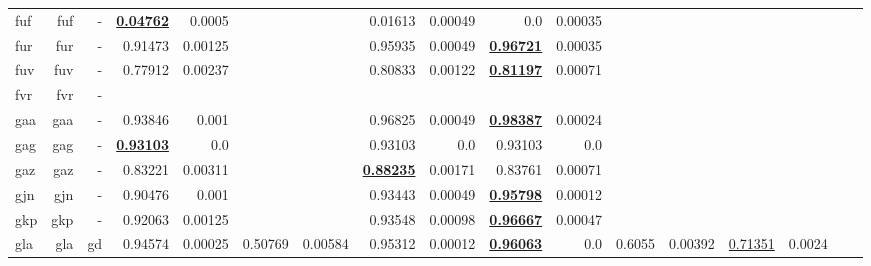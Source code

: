 \documentclass[11pt]{article}
\begin{document}
\begin{table*}[h]
{\begin{tabular}{lrrrrrrrrrrrrrrrr}
fuf         & fuf         & -         & \textbf{\underline{0.04762}}         & 0.0005         &          &          & 0.01613         & 0.00049         & 0.0         & 0.00035         &          &          &          &          \\
fur         & fur         & -         & 0.91473         & 0.00125         &          &          & 0.95935         & 0.00049         & \textbf{\underline{0.96721}}         & 0.00035         &          &          &          &          \\
fuv         & fuv         & -         & 0.77912         & 0.00237         &          &          & 0.80833         & 0.00122         & \textbf{\underline{0.81197}}         & 0.00071         &          &          &          &          \\
fvr         & fvr         & -         &          &          &          &          &          &          &          &          &          &          &          &          \\
gaa         & gaa         & -         & 0.93846         & 0.001         &          &          & 0.96825         & 0.00049         & \textbf{\underline{0.98387}}         & 0.00024         &          &          &          &          \\
gag         & gag         & -         & \textbf{\underline{0.93103}}         & 0.0         &          &          & 0.93103         & 0.0         & 0.93103         & 0.0         &          &          &          &          \\
gaz         & gaz         & -         & 0.83221         & 0.00311         &          &          & \textbf{\underline{0.88235}}         & 0.00171         & 0.83761         & 0.00071         &          &          &          &          \\
gjn         & gjn         & -         & 0.90476         & 0.001         &          &          & 0.93443         & 0.00049         & \textbf{\underline{0.95798}}         & 0.00012         &          &          &          &          \\
gkp         & gkp         & -         & 0.92063         & 0.00125         &          &          & 0.93548         & 0.00098         & \textbf{\underline{0.96667}}         & 0.00047         &          &          &          &          \\
gla         & gla         & gd         & 0.94574         & 0.00025         & 0.50769         & 0.00584         & 0.95312         & 0.00012         & \textbf{\underline{0.96063}}         & 0.0         & 0.6055         & 0.00392         & \underline{0.71351}         & 0.0024         \\

\end{tabular}}
\end{table*}
\end{document}
